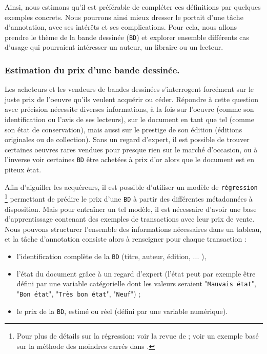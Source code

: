 		Ainsi, nous estimons qu'il est préférable de compléter ces définitions par quelques exemples concrets.
		Nous pourrons ainsi mieux dresser le portait d'une tâche d'annotation, avec ses intérêts et ses complications.
		Pour cela, nous allons prendre le thème de la bande dessinée (\texttt{BD}) et explorer ensemble différents cas d'usage qui pourraient intéresser un auteur, un libraire ou un lecteur.
		
		
		\subsubsection{Estimation du prix d'une bande dessinée.}
		\label{section:2.1.2.A-PRESENTATION-ANNOTATION-EXEMPLES-REGRESSION}
		
			Les acheteurs et les vendeurs de bandes dessinées s'interrogent forcément sur le juste prix de l'oeuvre qu'ils veulent acquérir ou céder.
			Répondre à cette question avec précision nécessite diverses informations, à la fois sur l'oeuvre (comme son identification ou l'avis de ses lecteurs), sur le document en tant que tel (comme son état de conservation), mais aussi sur le prestige de son édition (éditions originales ou de collection).
			Sans un regard d'expert, il est possible de trouver certaines oeuvres rares vendues pour presque rien sur le marché d'occasion, ou à l'inverse voir certaines \texttt{BD} être achetées à prix d'or alors que le document est en piteux état.
			
			Afin d'aiguiller les acquéreurs, il est possible d'utiliser un modèle de \texttt{régression} \footnote{
				Pour plus de détails sur la régression: voir la revue de \cite{maalouf:2011:logistic-regression-data} ; voir un exemple basé sur la méthode des moindres carrés dans \cite{zdaniuk:2014:ordinary-leastsquares-ols}.
			} permettant de prédire le prix d'une \texttt{BD} à partir des différentes métadonnées à disposition.
			Mais pour entraîner un tel modèle, il est nécessaire d'avoir une base d'apprentissage contenant des exemples de transactions avec leur prix de vente.
			Nous pouvons structurer l'ensemble des informations nécessaires dans un tableau, et la tâche d'annotation consiste alors à renseigner pour chaque transaction :
			\begin{itemize}
				\item l'identification complète de la \texttt{BD} (titre, auteur, édition, ... ),
				\item l'état du document grâce à un regard d'expert (l'état peut par exemple être défini par une variable catégorielle dont les valeurs seraient "\texttt{Mauvais état}", "\texttt{Bon état}", "\texttt{Très bon état}", "\texttt{Neuf}") ;
				\item le prix de la \texttt{BD}, estimé ou réel (défini par une variable numérique).
			\end{itemize}
			
